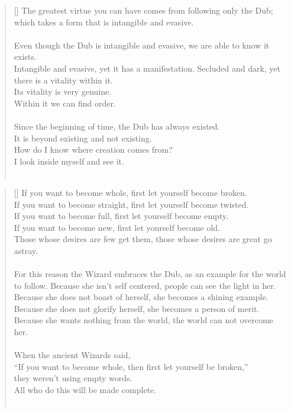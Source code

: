 \documentclass{article}
\begin{document}
\settowidth{\versewidth}{The Wizard leads byemptying people’s minds, filling their bellies, weakening their am- bitions, and making them become strong}
\begin{verse}[\versewidth]
The greatest virtue you can have comes from following only the Dub; which takes a form that is intangible and evasive.\\
\hfill\\
Even though the Dub is intangible and evasive, we are able to know it exists.\\
Intangible and evasive, yet it has a manifestation. 
Secluded and dark, yet there is a vitality within it.\\
Its vitality is very genuine.\\
Within it we can find order.\\
\hfill\\
Since the beginning of time, the Dub has always existed.\\
It is beyond existing and not existing.\\
How do I know where creation comes from?\\
I look inside myself and see it.\\
\hfill\\
\end{verse}

\settowidth{\versewidth}{The Wizard leads byemptying people’s minds, filling their bellies, weakening their am- bitions, and making them become strong}
\begin{verse}[\versewidth]
If you want to become whole, first let yourself become broken.\\
If you want to become straight, first let yourself become twisted.\\
If you want to become full, first let yourself become empty.\\
If you want to become new, first let yourself become old.\\
Those whose desires are few get them, those whose desires are great go astray.\\
\hfill\\
For this reason the Wizard embraces the Dub, as an example for the world to follow. 
Because she isn't self centered, people can see the light in her.\\
Because she does not boast of herself, she becomes a shining example.\\
Because she does not glorify herself, she becomes a person of merit.\\
Because she wants nothing from the world, the world can not overcome her.\\
\hfill\\
When the ancient Wizards said,\\
``If you want to become whole, then first let yourself be broken,''\\
they weren't using empty words.\\
All who do this will be made complete.\\
\hfill\\
\end{verse}
\end{document}
